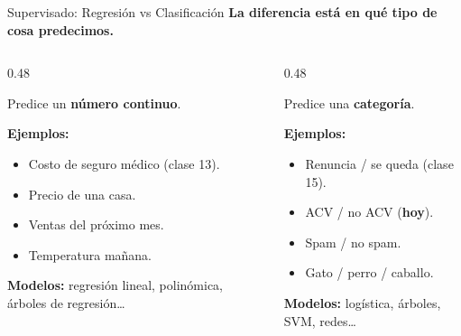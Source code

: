 \documentclass[aspectratio=169, 11pt]{beamer}
\begin{document}
\begin{frame}{Supervisado: Regresión vs Clasificación}
  \vspace{-4pt}
  {\footnotesize\color{arcaDark}\bfseries
    La diferencia está en \textbf{qué tipo de cosa} predecimos.}

  \vspace{6pt}
  \begin{columns}[T]
    \begin{column}{0.48\textwidth}
      \begin{tcolorbox}[colback=codeBlue!8, colframe=codeBlue, boxrule=0.5pt,
        arc=2pt, title={\small\color{white}\bfseries\faRulerVertical\ Regresión}]
        {\scriptsize
        Predice un \textbf{número continuo}.
        \vspace{4pt}

        \textbf{Ejemplos:}
        \begin{itemize}\setlength{\itemsep}{2pt}
          \item Costo de seguro médico (clase 13).
          \item Precio de una casa.
          \item Ventas del próximo mes.
          \item Temperatura mañana.
        \end{itemize}

        \vspace{4pt}
        \textbf{Modelos:} regresión lineal, polinómica, árboles de regresión\ldots}
      \end{tcolorbox}
    \end{column}
    \begin{column}{0.48\textwidth}
      \begin{tcolorbox}[colback=arcaRed!8, colframe=arcaRed, boxrule=0.5pt,
        arc=2pt, title={\small\color{white}\bfseries\faListUl\ Clasificación}]
        {\scriptsize
        Predice una \textbf{categoría}.
        \vspace{4pt}

        \textbf{Ejemplos:}
        \begin{itemize}\setlength{\itemsep}{2pt}
          \item Renuncia / se queda (clase 15).
          \item ACV / no ACV (\textbf{hoy}).
          \item Spam / no spam.
          \item Gato / perro / caballo.
        \end{itemize}

        \vspace{4pt}
        \textbf{Modelos:} logística, árboles, SVM, redes\ldots}
      \end{tcolorbox}
    \end{column}
  \end{columns}
\end{frame}
\end{document}
